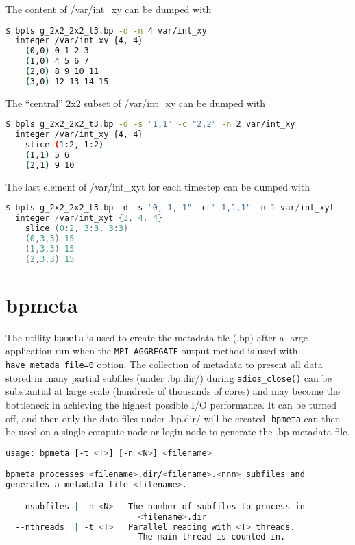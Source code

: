 The content of /var/int\_xy can be dumped with
\begin{lstlisting}[language=bash,caption={},label={}]
$ bpls g_2x2_2x2_t3.bp -d -n 4 var/int_xy
  integer /var/int_xy {4, 4} 
    (0,0) 0 1 2 3
    (1,0) 4 5 6 7
    (2,0) 8 9 10 11
    (3,0) 12 13 14 15
\end{lstlisting}

The ``central'' 2x2 subset of /var/int\_xy can be dumped with
\begin{lstlisting}[language=bash,caption={},label={}]
$ bpls g_2x2_2x2_t3.bp -d -s "1,1" -c "2,2" -n 2 var/int_xy
  integer /var/int_xy {4, 4} 
    slice (1:2, 1:2)
    (1,1) 5 6
    (2,1) 9 10
\end{lstlisting}

The last element of /var/int\_xyt for each timestep can be dumped with
\begin{lstlisting}[language=C,caption={},label={}]
$ bpls g_2x2_2x2_t3.bp -d -s "0,-1,-1" -c "-1,1,1" -n 1 var/int_xyt
  integer /var/int_xyt {3, 4, 4} 
    slice (0:2, 3:3, 3:3)
    (0,3,3) 15
    (1,3,3) 15
    (2,3,3) 15
\end{lstlisting}


\section{bpmeta}

The utility \verb+bpmeta+ is used to create the metadata file (.bp) after a large application run when the \verb+MPI_AGGREGATE+ output method  is used with \verb+have_metada_file=0+ option. 
The collection of metadata to present all data stored in many partial subfiles (under .bp.dir/) during \verb+adios_close()+ can be substantial at large scale (hundreds of thousands of cores) and may become the bottleneck in achieving the highest possible I/O performance. It can be turned off, and then only the data files under .bp.dir/ will be created. \verb+bpmeta+ can then be used on a single compute node or login node to generate the .bp metadata file. 

\begin{lstlisting}[language=bash,caption={},label={}]
usage: bpmeta [-t <T>] [-n <N>] <filename>

bpmeta processes <filename>.dir/<filename>.<nnn> subfiles and 
generates a metadata file <filename>.

  --nsubfiles | -n <N>   The number of subfiles to process in
                           <filename>.dir
  --nthreads  | -t <T>   Parallel reading with <T> threads.
                           The main thread is counted in.
\end{lstlisting}

